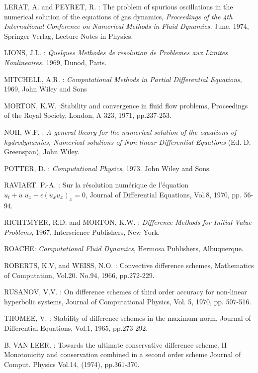 \begin{thebibliography}{99}
 LERAT, A. and PEYRET, R. : The problem of spurious
  oscillations in the numerical solution of the equations of gas
  dynamics, \textit{Proceedings of the 4th International Conference on
    Numerical Methods in Fluid Dynamics.} June, 1974, Springer-Verlag,
  Lecture Notes in Physics.  

 LIONS, J.L. : \textit{Quelques Methodes de resolution
  de Problemes aux Limites Nonlineaires.} 1969, Dunod, Paris. 

 MITCHELL, A.R. : \textit{Computational Methods in
  Partial Differential Equations}, 1969, John Wiley and Sons  

 MORTON, K.W. :\pageoriginale Stability and convergence
  in fluid flow problems, Proceedings of the Royal Society, London, A
  323, 1971, pp.237-253.  

 NOH, W.F. : \textit{A general theory for the numerical
  solution of the equations of hydrodynamics, Numerical solutions of
  Non-linear Differential Equations} (Ed. D. Greenspan), John Wiley. 

 POTTER, D. : \textit{Computational Physics},
  1973. John Wiley and Sons.  

 RAVIART. P.-A. : Sur la r\'esolution num\'erique de
  l'\'equation $u_t + u \; u_x - \epsilon (u_x u_x)_x = 0$, Journal of
  Differential Equations, Vol.8, 1970, pp. 56-94. 

 RICHTMYER, R.D. and MORTON, K.W. : \textit{Difference
  Methods for Initial Value Problems}, 1967, Interscience Publishers,
  New York.  

 ROACHE: \textit{Computational Fluid Dynamics}, Hermosa
  Publishers, Albuquerque.  

 ROBERTS, K.V, and WEISS, N.O. : Convective difference
  schemes, Mathematics of Computation, Vol.20. No.94, 1966,
  pp.272-229. 

 RUSANOV, V.V. : On difference schemes of third order
  accuracy for non-linear hyperbolic systems, Journal of Computational
  Physics, Vol. 5, 1970, pp. 507-516.  

 THOMEE, V. : Stability of difference schemes in the
  maximum norm, Journal of Differential Equations, Vol.1, 1965,
  pp.273-292.  

 B. VAN LEER. : Towards the ultimate conservative
  difference scheme. II Monotonicity and conservation combined  in a
  second order scheme Journal of Comput. Physics Vol.14, (1974),
  pp.361-370.  
\end{thebibliography}
